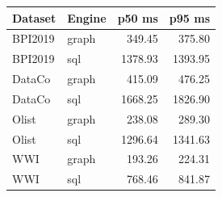\begin{tabular}{llrr}
\toprule
Dataset & Engine & p50 ms & p95 ms \\
\midrule
BPI2019 & graph & 349.45 & 375.80 \\
BPI2019 & sql & 1378.93 & 1393.95 \\
DataCo & graph & 415.09 & 476.25 \\
DataCo & sql & 1668.25 & 1826.90 \\
Olist & graph & 238.08 & 289.30 \\
Olist & sql & 1296.64 & 1341.63 \\
WWI & graph & 193.26 & 224.31 \\
WWI & sql & 768.46 & 841.87 \\
\bottomrule
\end{tabular}
